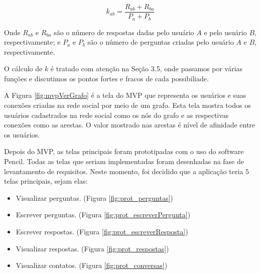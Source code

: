 \begin{equation}
k_{ab} = \frac{R_{ab}+R_{ba}}{P_{a} + P_{b}}
 \label{eq:k-1}
\end{equation}

Onde $R_{ab}$ e $R_{ba}$ são o número de respostas dadas pelo usuário $A$ e pelo usuário $B$, respectivamente; e $P_{a}$ e $P_{b}$ são o número de perguntas criadas pelo usuário $A$ e $B$, respectivamente.

O cálculo de $k$ é tratado com atenção na Seção 3.5, onde passamos por várias funções e discutimos os pontos fortes e fracos de cada possibiliade.

A Figura \ref{fig:mvpVerGrafo} é a tela do MVP que representa os usuários e suas conexões criadas na rede social por meio de um grafo. Esta tela mostra todos os usuários cadastrados na rede social como os nós do grafo e as respectivas conexões como as arestas. O valor mostrado nas arestas é nível de afinidade entre os usuários.
\FloatBarrier

Depois do MVP, as telas principais foram prototipadas com o uso do software Pencil. Todas as telas que seriam implementadas foram desenhadas na fase de levantamento de requisitos. Neste momento, foi decidido que a aplicação teria 5 telas principais, sejam elas:

\begin{itemize}
\item Visualizar perguntas. (Figura \ref{fig:prot_perguntas})
\item Escrever perguntas. (Figura \ref{fig:prot_escreverPergunta})
\item Escrever respostas. (Figura \ref{fig:prot_escreverResposta})
\item Visualizar respostas. (Figura \ref{fig:prot_respostas})
\item Visualizar contatos. (Figura \ref{fig:prot_conversas})
\end{itemize}


